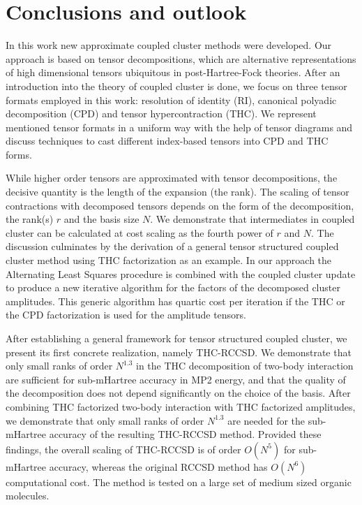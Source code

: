 \chapter*{Conclusions and outlook
\label{ch:conclusions}}
In this work new approximate coupled cluster methods were developed. Our 
approach is based on tensor decompositions, which are alternative 
representations of high dimensional tensors ubiquitous in post-Hartree-Fock 
theories. After an introduction into the theory of coupled cluster is done, we 
focus on three tensor formats employed in this work: resolution of 
identity (RI), canonical polyadic decomposition (CPD) and tensor 
hypercontraction (THC). We represent mentioned tensor formats in a uniform way 
with the help of tensor diagrams and discuss techniques to cast different 
index-based tensors into CPD and THC forms. 

While higher order tensors are approximated with tensor decompositions, the 
decisive quantity is the length of the expansion (the rank). The scaling of 
tensor contractions with decomposed tensors depends on the form of the 
decomposition, the rank(s) $r$ and the basis size $N$. We 
demonstrate that intermediates in coupled cluster can be calculated at 
cost scaling as the fourth power of $r$ and $N$. The discussion culminates by 
the derivation of a general tensor structured coupled cluster method using THC 
factorization as an example. In our approach the Alternating Least Squares 
procedure is combined with the coupled cluster update to produce a new 
iterative algorithm for the factors of the decomposed cluster amplitudes. This 
generic algorithm has quartic cost per iteration if the THC or the CPD 
factorization is used for the amplitude tensors.

After establishing a general framework for tensor structured coupled cluster, 
we present its first concrete realization, namely THC-RCCSD. We demonstrate 
that only small ranks of order $N^{1.3}$ in the THC decomposition of two-body 
interaction are sufficient for sub-mHartree accuracy in MP2 energy, and 
that the quality of the decomposition does not depend significantly on the 
choice of the basis. After combining THC factorized two-body interaction with 
THC factorized amplitudes, we demonstrate that only small ranks of order 
$N^{1.3}$ are needed for the sub-mHartree accuracy of the resulting THC-RCCSD 
method. Provided these findings, the overall scaling of THC-RCCSD is of order 
$O(N^{5})$ for sub-mHartree accuracy, whereas the original RCCSD method has 
$O(N^{6})$ computational cost. The method is tested on a large set of medium 
sized organic molecules.   

